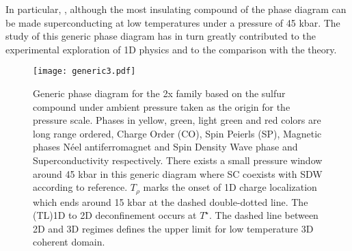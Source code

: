 \documentclass[11pt]{article} %
\begin{document}
In particular,   \tmps , although  the most insulating compound of the phase diagram can be made  superconducting at low temperatures under a pressure  of 45 kbar\cite{Wilhelm01,Adachi00}. The study of this generic phase diagram has in turn greatly contributed   to  the experimental exploration of 1D physics and to the comparison with the theory.
\begin{figure}[h]	
 \centerline{\texttt{[image: generic3.pdf]}}
\caption{Generic phase diagram for the  \tm2x family\cite{Jerome91} based on the sulfur compound \tmps under ambient pressure taken as the origin for the pressure scale. Phases in  yellow, green, light green and red colors are  long range ordered, Charge Order (CO), Spin Peierls (SP), Magnetic phases N\'eel antiferromagnet and Spin Density Wave phase and Superconductivity respectively. There exists a small pressure window around 45 kbar in this generic diagram where SC coexists with SDW according to reference\cite{Vuletic02,Kang10,Narayanan14}.  $T_\rho$  %
 marks the onset of 1D charge localization which ends around 15 kbar at the dashed double-dotted line.   The (TL)1D to 2D deconfinement occurs at $T^\star$. The dashed line between 2D and 3D regimes defines the upper limit for low temperature 3D coherent domain. }
\label{generic3.pdf} 
\end{figure}

 
\end{document}
